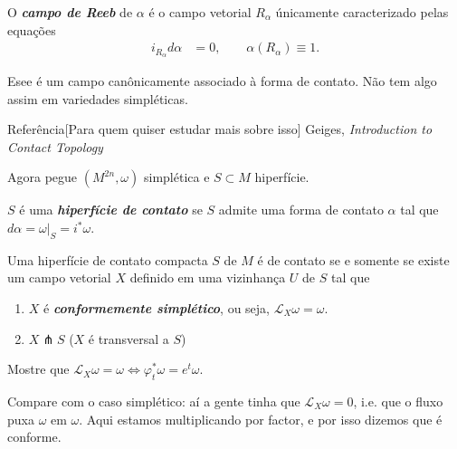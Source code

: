 \begin{defn}\leavevmode
	O \textit{\textbf{campo de Reeb}} de $\alpha$ é o campo vetorial $R_\alpha$ únicamente caracterizado pelas equações 
	\begin{align*}
		i_{R_\alpha}d \alpha&=0,\qquad \alpha(R_\alpha)\equiv 1.
	\end{align*}
\end{defn}

\begin{remark}\leavevmode
	Esee é um campo canônicamente associado à forma de contato. Não tem algo assim em variedades simpléticas.
\end{remark}

\begin{thing4}{Referência}[Para quem quiser estudar mais sobre isso]\leavevmode
	Geiges, \textit{Introduction to Contact Topology} 
\end{thing4}

Agora pegue $(M^{2n},\omega)$ simplética e $S\subset M$ hiperfície.

\begin{defn}\leavevmode
	$S$ é uma \textit{\textbf{hiperfície de contato}} se  $S$ admite uma forma de contato $\alpha$ tal que $d\alpha=\omega|_{S}=i^*\omega$.
\end{defn}

\begin{thm}\leavevmode
	Uma hiperfície de contato compacta $S$ de $M$ é de contato se e somente se existe um campo vetorial $X$ definido em uma vizinhança $U$ de $S$ tal que
	\begin{enumerate}
		\item $X$ é \textit{\textbf{conformemente simplético}}, ou seja, $\mathcal{L}_X\omega=\omega$.
		\item $X\pitchfork S$ ($X$ é transversal a $S$)
	\end{enumerate}
\end{thm}

\begin{exercise}\leavevmode
	 Mostre que  $\mathcal{L}_X\omega=\omega\iff \varphi_t^*\omega=e^t \omega$.

	 Compare com o caso simplético: aí a gente tinha que $\mathcal{L}_X\omega=0$, i.e. que o fluxo puxa $\omega$ em $\omega$. Aqui estamos multiplicando por factor, e por isso dizemos que é conforme.
\end{exercise}

